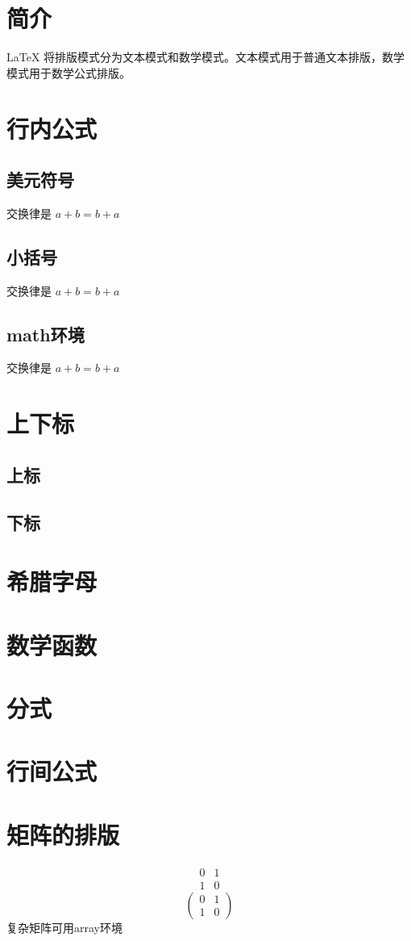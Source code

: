 \documentclass{ctexart}%
\begin{document}
    \section{简介}
    \LaTeX{} 将排版模式分为文本模式和数学模式。文本模式用于普通文本排版，数学模式用于数学公式排版。
    \section{行内公式}
    \subsection{美元符号}
    交换律是 $a+b=b+a$
    \subsection{小括号}
    交换律是 \(a+b=b+a\)
    \subsection{math环境}
    交换律是 \begin{math}
    	a+b=b+a
    \end{math}
    \section{上下标}
    \subsection{上标}
    \subsection{下标}
    \section{希腊字母}
    \section{数学函数}
    \section{分式}
    \section{行间公式}
    \section{矩阵的排版}
    \[
    \begin{matrix}
    	0 & 1\\
    	1 & 0
    \end{matrix}
     \]
     \[
     \begin{pmatrix}
     	0 & 1\\
     	1 & 0
     \end{pmatrix}
     \]
     复杂矩阵可用array环境
\end{document}
